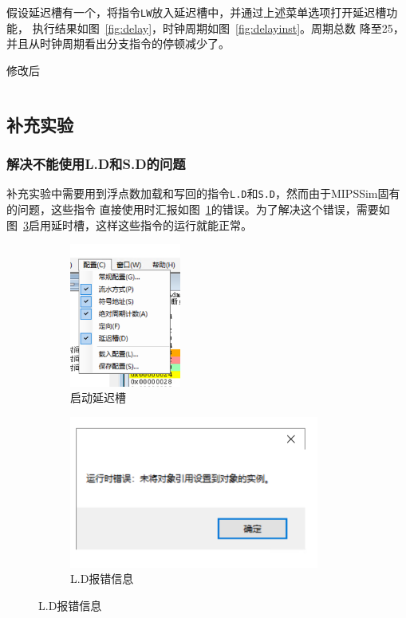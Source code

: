 \documentclass[a4paper,twoside]{article}
\begin{document}
\begin{spacing}{1.2}
假设延迟槽有一个，将指令\texttt{LW}放入延迟槽中，并通过上述菜单选项打开延迟槽功能，
执行结果如图~\ref{fig:delay}，时钟周期如图~\ref{fig:delayinst}。周期总数
降至25，并且从时钟周期看出分支指令的停顿减少了。

\begin{listing}[htb]
	\caption{修改后}
	\label{code:delayedbranch}
	\inputminted{nasm}{../code/delayed_branch.s}
\end{listing}

\clearpage

\subsection{补充实验}

\subsubsection{解决不能使用L.D和S.D的问题}

补充实验中需要用到浮点数加载和写回的指令\texttt{L.D}和\texttt{S.D}，然而由于MIPSSim固有的问题，这些指令
直接使用时汇报如图~\ref{fig:ts1}的错误。为了解决这个错误，需要如图~\ref{fig:ts2}启用延时槽，这样这些指令的运行就能正常。
\begin{figure}[htb]
	\centering
	\begin{subfigure}[b]{0.4\textwidth}
		\centering
		\includegraphics[width=0.4\textwidth]{images/ts1.png}
		\caption{启动延迟槽}
		\label{fig:ts1}
	\end{subfigure}
	\begin{subfigure}[b]{0.4\textwidth}
		\centering
		\includegraphics[width=0.9\textwidth]{images/ts2.png}
		\caption{L.D报错信息}
		\label{fig:ts2}
	\end{subfigure}
\end{figure}


\end{spacing}
\end{document}
